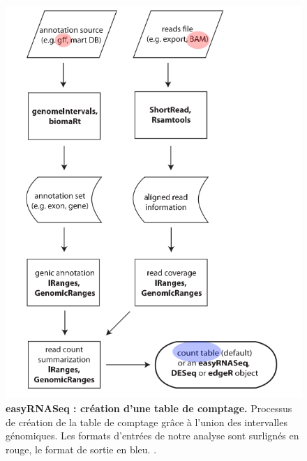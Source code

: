 \documentclass[12pt,a4paper]{report}
\begin{document}
\begin{onehalfspace}
\begin{figure}[ht]
\centerline{\includegraphics[scale=0.3]{figures/easyRNASeq.png}}
\caption{\textbf{easyRNASeq : création d'une table de comptage.} Processus de création de la table de comptage grâce à l'union des intervalles génomiques. Les formats d'entrées de notre analyse sont surlignés en rouge, le format de sortie en bleu. \citep{Delhomme2012}.}\label{fig:easyRNAseq} 
\end{figure}







\end{onehalfspace}


\printglossary[type=\acronymtype ,title=Glossaire]

%

\end{document}
